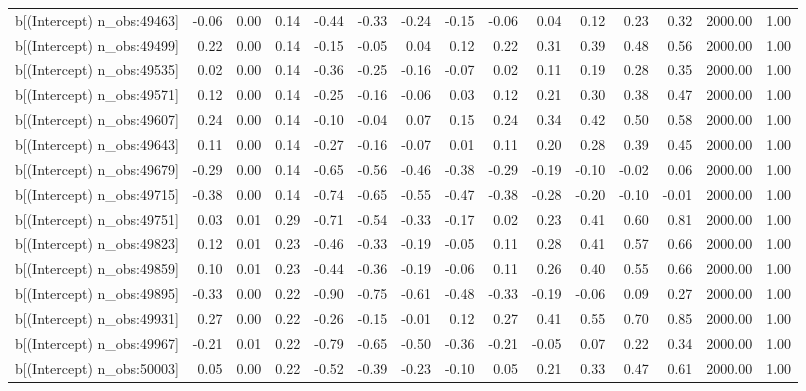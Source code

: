 \begin{table}[ht]
\begin{tabular}{rrrrrrrrrrrrrrr}
  b[(Intercept) n\_obs:49463] & -0.06 & 0.00 & 0.14 & -0.44 & -0.33 & -0.24 & -0.15 & -0.06 & 0.04 & 0.12 & 0.23 & 0.32 & 2000.00 & 1.00 \\ 
  b[(Intercept) n\_obs:49499] & 0.22 & 0.00 & 0.14 & -0.15 & -0.05 & 0.04 & 0.12 & 0.22 & 0.31 & 0.39 & 0.48 & 0.56 & 2000.00 & 1.00 \\ 
  b[(Intercept) n\_obs:49535] & 0.02 & 0.00 & 0.14 & -0.36 & -0.25 & -0.16 & -0.07 & 0.02 & 0.11 & 0.19 & 0.28 & 0.35 & 2000.00 & 1.00 \\ 
  b[(Intercept) n\_obs:49571] & 0.12 & 0.00 & 0.14 & -0.25 & -0.16 & -0.06 & 0.03 & 0.12 & 0.21 & 0.30 & 0.38 & 0.47 & 2000.00 & 1.00 \\ 
  b[(Intercept) n\_obs:49607] & 0.24 & 0.00 & 0.14 & -0.10 & -0.04 & 0.07 & 0.15 & 0.24 & 0.34 & 0.42 & 0.50 & 0.58 & 2000.00 & 1.00 \\ 
  b[(Intercept) n\_obs:49643] & 0.11 & 0.00 & 0.14 & -0.27 & -0.16 & -0.07 & 0.01 & 0.11 & 0.20 & 0.28 & 0.39 & 0.45 & 2000.00 & 1.00 \\ 
  b[(Intercept) n\_obs:49679] & -0.29 & 0.00 & 0.14 & -0.65 & -0.56 & -0.46 & -0.38 & -0.29 & -0.19 & -0.10 & -0.02 & 0.06 & 2000.00 & 1.00 \\ 
  b[(Intercept) n\_obs:49715] & -0.38 & 0.00 & 0.14 & -0.74 & -0.65 & -0.55 & -0.47 & -0.38 & -0.28 & -0.20 & -0.10 & -0.01 & 2000.00 & 1.00 \\ 
  b[(Intercept) n\_obs:49751] & 0.03 & 0.01 & 0.29 & -0.71 & -0.54 & -0.33 & -0.17 & 0.02 & 0.23 & 0.41 & 0.60 & 0.81 & 2000.00 & 1.00 \\ 
  b[(Intercept) n\_obs:49823] & 0.12 & 0.01 & 0.23 & -0.46 & -0.33 & -0.19 & -0.05 & 0.11 & 0.28 & 0.41 & 0.57 & 0.66 & 2000.00 & 1.00 \\ 
  b[(Intercept) n\_obs:49859] & 0.10 & 0.01 & 0.23 & -0.44 & -0.36 & -0.19 & -0.06 & 0.11 & 0.26 & 0.40 & 0.55 & 0.66 & 2000.00 & 1.00 \\ 
  b[(Intercept) n\_obs:49895] & -0.33 & 0.00 & 0.22 & -0.90 & -0.75 & -0.61 & -0.48 & -0.33 & -0.19 & -0.06 & 0.09 & 0.27 & 2000.00 & 1.00 \\ 
  b[(Intercept) n\_obs:49931] & 0.27 & 0.00 & 0.22 & -0.26 & -0.15 & -0.01 & 0.12 & 0.27 & 0.41 & 0.55 & 0.70 & 0.85 & 2000.00 & 1.00 \\ 
  b[(Intercept) n\_obs:49967] & -0.21 & 0.01 & 0.22 & -0.79 & -0.65 & -0.50 & -0.36 & -0.21 & -0.05 & 0.07 & 0.22 & 0.34 & 2000.00 & 1.00 \\ 
  b[(Intercept) n\_obs:50003] & 0.05 & 0.00 & 0.22 & -0.52 & -0.39 & -0.23 & -0.10 & 0.05 & 0.21 & 0.33 & 0.47 & 0.61 & 2000.00 & 1.00 \\ 

\end{tabular}
\end{table}
